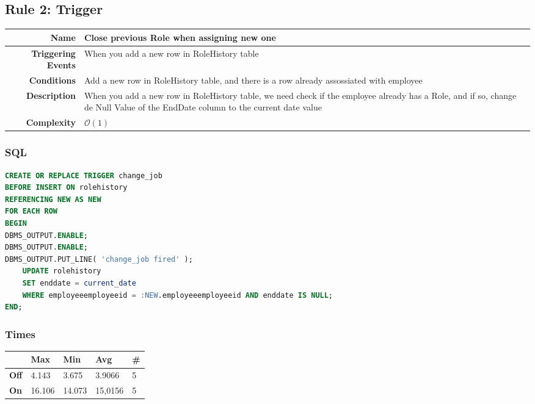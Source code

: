 \documentclass[a4paper, 10pt]{article}
\begin{document}
\begin{minipage}\linewidth
\subsection{Rule 2: Trigger}

\begin{table}[H]
\begin{tabularx}{\linewidth}{| r | X |}
\hline
\textbf{Name}              & Close previous Role when assigning new one \\ \hline
\textbf{Triggering Events} & When you add a new row in RoleHistory table \\ \hline
\textbf{Conditions}        & Add a new row in RoleHistory table, and there is a row already assossiated with employee \\ \hline
\textbf{Description}       & When you add a new row in RoleHistory table, we need check if the employee already has a Role, and if so, change de Null Value of the EndDate column to the current date value \\ \hline
\textbf{Complexity}        & $\mathcal{O}(1)$  \\ \hline
\end{tabularx}
\end{table}

\subsubsection{SQL}
\begin{lstlisting}[language=SQL]
CREATE OR REPLACE TRIGGER change_job
BEFORE INSERT ON rolehistory
REFERENCING NEW AS NEW 
FOR EACH ROW
BEGIN
DBMS_OUTPUT.ENABLE; 
DBMS_OUTPUT.ENABLE; 
DBMS_OUTPUT.PUT_LINE( 'change_job fired' );
    UPDATE rolehistory
    SET enddate = current_date
    WHERE employeeemployeeid = :NEW.employeeemployeeid AND enddate IS NULL;
END;
  \end{lstlisting}


\subsubsection{Times}
\begin{table}[H]
\begin{tabular}{l|l|l|l|l|}
\cline{2-5}
\textbf{}                             & \textbf{Max} & \textbf{Min} & \textbf{Avg} & \textbf{\#}  \\ \hline
\multicolumn{1}{|l|}{\textbf{Off}} & 4.143         & 3.675         & 3.9066          & 5            \\ \hline
\multicolumn{1}{|l|}{\textbf{On}}  & 16.106         & 14.073         & 15,0156          & 5            \\ \hline
\end{tabular}
\end{table}
\end{minipage}
\end{document}
